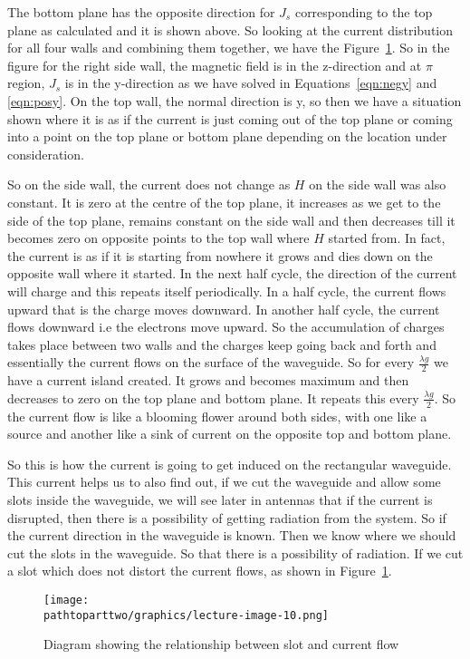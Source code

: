 The bottom plane has the opposite direction for $J_{s}$ corresponding to the top plane as calculated and it is shown above. So looking at the current distribution for all four walls and combining them together, we have the Figure~\ref{fig:lectureimage10}. So in the figure for the right side wall, the magnetic field is in the z-direction and at $\pi$ region, $J_{s}$ is in the y-direction as we have solved in Equations~\ref{eqn:negy} and \ref{eqn:posy}. On the top wall, the normal direction is y, so then we have a situation shown where it is as if the current is just coming out of the top plane or coming into a point on the top plane or bottom plane depending on the location under consideration. 

So on the side wall, the current does not change as $H$ on the side wall was also constant. It is zero at the centre of the top plane, it increases as we get to the side of the top plane, remains constant on the side wall and then decreases till it becomes zero on opposite points to the top wall where $H$ started from. In fact, the current is as if it is starting from nowhere it grows and dies down on the opposite wall where it started. In the next half cycle, the direction of the current will charge and this repeats itself periodically. In a half cycle, the current flows upward that is the charge moves downward. In another half cycle, the current flows downward i.e the electrons move upward. So the accumulation of charges takes place between two walls and the charges keep going back and forth and essentially the current flows on the surface of the waveguide. So for every $\frac{\lambda g}{2}$ we have a current island created. It grows and becomes maximum and then decreases to zero on the top plane and bottom plane. It repeats this every $\frac{\lambda g}{2}$. So the current flow is like a blooming flower around both sides, with one like a source and another like a sink of current on the opposite top and bottom plane.
	
So this is how the current is going to get induced on the rectangular waveguide. This current helps us to also find out, if we cut the waveguide and allow some slots inside the waveguide, we will see later in antennas that if the current is disrupted, then there is a possibility of getting radiation from the system. So if the current direction in the waveguide is known. Then we know where we should cut the slots in the waveguide. So that there is a possibility of radiation. If we cut a slot which does not distort the current flows, as shown in Figure~\ref{fig:lectureimage10}.
\begin{figure}[h]
\centering
\texttt{[image: \\pathtoparttwo/graphics/lecture-image-10.png]}
\label{fig:lectureimage10}
\caption{Diagram showing the relationship between slot and current flow}
\end{figure}

